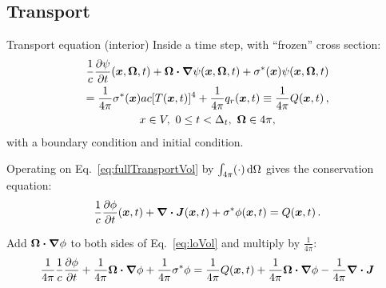 \documentclass{beamer}
\begin{document}
\subsection{Transport}
\begin{frame}{Transport equation (interior)}
Inside a time step, with ``frozen'' cross section:
\begin{multline} \label{eq:fullTransportVol}
  \frac{1}{c} \frac{\partial \psi}{\partial t}(\bm{x}, \bm{\Omega}, t)
    + \bm{\Omega}\bm{\cdot} \bm{\nabla} \psi(\bm{x}, \bm{\Omega}, t)
    + \sigma^\ast(\bm{x}) \psi (\bm{x}, \bm{\Omega}, t)
    \\
    = \frac{1}{4\pi} \sigma^\ast(\bm{x}) ac [T(\bm{x}, t)]^4
    + \frac{1}{4\pi} q_{r}(\bm{x}, t)
    \equiv \frac{1}{4\pi} Q(\bm{x}, t) \,,
\\
x \in V,\  0 \le t < \Delta_t, \ \bm{\Omega} \in 4\pi,
\end{multline}
with a boundary condition and initial condition.

Operating on Eq.~\eqref{eq:fullTransportVol} by $\int_{4\pi} (\cdot) \mathop{}\!\mathrm{d}\Omega$
gives the conservation equation:
\begin{equation} \label{eq:loVol}
\frac{1}{c} \frac{\partial \phi}{\partial t} (\bm{x}, t)
  + \bm{\nabla} \bm{\cdot}\bm{J}(\bm{x}, t)
  + \sigma^\ast \phi(\bm{x}, t)
  =  Q(\bm{x}, t)\,.
\end{equation}

Add $\bm{\Omega}\bm{\cdot}\bm{\nabla} \phi$ to both sides of Eq.~\eqref{eq:loVol} and
multiply by $\frac{1}{4\pi}$:
\begin{equation} \label{eq:modifiedConservation}
  \frac{1}{4\pi} \frac{1}{c} \frac{\partial \phi}{\partial t}
  + \frac{1}{4\pi} \bm{\Omega}\bm{\cdot}\bm{\nabla} \phi
  + \frac{1}{4\pi} \sigma^\ast \phi
  = \frac{1}{4\pi}  Q(\bm{x}, t) + \frac{1}{4\pi} \bm{\Omega}\bm{\cdot}\bm{\nabla} \phi
  - \frac{1}{4\pi} \bm{\nabla} \bm{\cdot}\bm{J}
\end{equation}
\end{frame}
\end{document}
